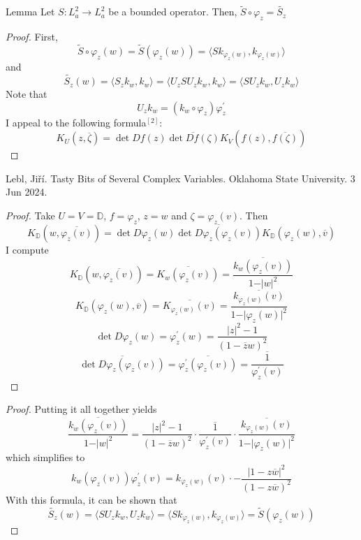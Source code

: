 \documentclass{beamer}
\begin{document}
\begin{frame}
\begin{alertblock}{Lemma}
Let $S: L_a^2 \rightarrow L_a^2$ be a bounded operator. Then, $\tilde{S} \circ \varphi_z = \widetilde{S_z} $
\end{alertblock}
\begin{proof}
First, 
\[
\tilde{S} \circ \varphi_z (w) = \tilde{S}(\varphi_z(w)) = \langle Sk_{\varphi_z(w)}, k_{\varphi_z(w)} \rangle
\] and
\[
\widetilde{S_z}(w) = \langle S_z k_w, k_w \rangle = \langle U_z S U_z k_w, k_w \rangle = \langle S U_z k_w,  U_z k_w \rangle
\] Note that
\[
U_z k_w = (k_w \circ \varphi_z) \varphi_z^\prime
\] I appeal to the following formula$^{[2]}$: 
\[
K_U(z, \overline{\zeta}) = \det Df(z) \overline{\det Df(\zeta)}  K_V(f(z), \overline{f(\zeta)})
\] 
\end{proof}
\tiny{Lebl, Jiří. Tasty Bits of Several Complex Variables. Oklahoma State University. 3 Jun 2024.}
\end{frame}
\begin{frame}
\begin{proof}
Take $U = V = \mathbb{D}$, $f = \varphi_z$, $z = w$ and $\zeta = \varphi_z(v)$. Then
 \[
 K_\mathbb{D}(w,\overline{\varphi_z(v)}) = \det D \varphi_z(w) \overline{\det D \varphi_z(\varphi_z(v))} K_\mathbb{D}(\varphi_z(w), \overline{v})
 \] I compute 
 \[
 K_\mathbb{D}(w,\overline{\varphi_z(v)}) = \overline{K_w(\varphi_z(v))} = \overline{\frac{k_w(\varphi_z(v))}{1 - \vert w \vert^2}}
 \] 
 \[
 K_\mathbb{D}(\varphi_z(w), \overline{v}) = \overline{K_{\varphi_z(w)}(v)} = \overline{\frac{k_{\varphi_z(w)}(v)}{1- \vert \varphi_z(w) \vert^2}}
 \] 
 \[
 \det D \varphi_z(w) = \varphi_z^\prime(w) = \frac{\vert z \vert^2 - 1}{(1-\overline{z}w)^2}
 \] 
 \[
 \overline{\det D \varphi_z(\varphi_z(v))} = \overline{\varphi_z^\prime(\varphi_z(v))} = \overline{\frac{1}{\varphi_z^\prime(v)}}
 \]
 \end{proof}
\end{frame}

\begin{frame}
\begin{proof}
Putting it all together yields 
 \[
 \overline{\frac{k_w(\varphi_z(v))}{1 - \vert w \vert^2}} =  \frac{\vert z \vert^2 - 1}{(1-\overline{z}w)^2} \cdot  \overline{\frac{1}{\varphi_z^\prime(v)}} \cdot  \overline{\frac{k_{\varphi_z(w)}(v)}{1- \vert \varphi_z(w) \vert^2}}
 \] which simplifies to
 \[
 k_w(\varphi_z(v)) \varphi_z^\prime(v) = k_{\varphi_z(w)}(v) \cdot -\frac{\vert 1- z \overline{w} \vert^2}{(1 - z \overline{w})^2}
 \] With this formula, it can be shown that
 \[
 \widetilde{S_z}(w) = \langle SU_z k_w,  U_z k_w\rangle = \langle Sk_{\varphi_z(w)}, k_{\varphi_z(w)} \rangle = \tilde{S}(\varphi_z(w))
 \]
 \end{proof}
\end{frame}
\end{document}
